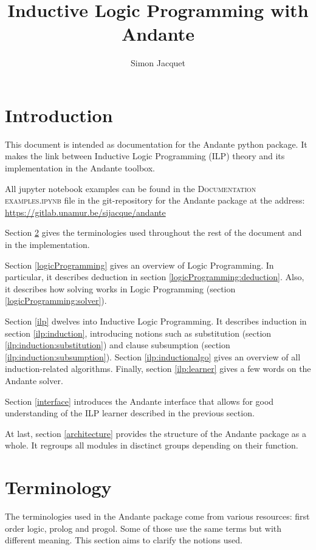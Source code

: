 \documentclass{article}
\title{Inductive Logic Programming with Andante}
\author{Simon Jacquet}
\begin{document}
\maketitle
\section{Introduction} \label{introduction}

This document is intended as documentation for the Andante python package. It 
makes the link between Inductive Logic Programming (ILP) theory and its 
implementation in the Andante toolbox.

All jupyter notebook examples can be found in the \textsc{Documentation
examples.ipynb} file in the git-repository for the Andante package at the
address: \url{https://gitlab.unamur.be/sijacque/andante}

Section \ref{terminology} gives the terminologies used throughout the rest of 
the document and in the implementation.

Section \ref{logicProgramming} gives an overview of Logic Programming. In
particular, it describes deduction in section \ref{logicProgramming:deduction}.
Also, it describes how solving works in Logic Programming (section
\ref{logicProgramming:solver}).

Section \ref{ilp} dwelves into Inductive Logic Programming. It describes
induction in section \ref{ilp:induction}, introducing notions such as
substitution (section \ref{ilp:induction:substitution}) and clause subsumption
(section \ref{ilp:induction:subsumption}). Section \ref{ilp:inductionalgo}
gives an overview of all induction-related algorithms. Finally, section
\ref{ilp:learner} gives a few words on the Andante solver.

Section \ref{interface} introduces the Andante interface that allows for good 
understanding of the ILP learner described in the previous section.

At last, section \ref{architecture} provides the structure of the Andante
package as a whole. It regroups all modules in disctinct groups depending on
their function.

\newpage
\section{Terminology} \label{terminology}

The terminologies used in the Andante package come from various resources:
first order logic, prolog and progol. Some of those use the same terms but with
different meaning. This section aims to clarify the notions used.
\end{document}
